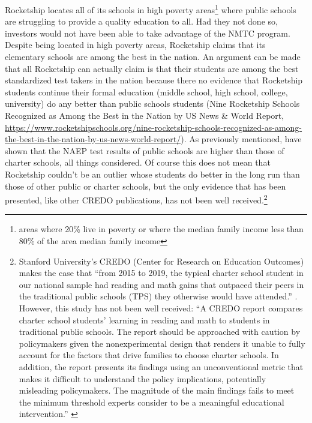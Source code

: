 Rocketship locates all of its schools in high poverty areas\footnote{areas where 20\% live in poverty or where the median family income less than 80\% of the area median family income\parencite[13-14]{CDFI2020}} where public schools are struggling to provide a quality education to all. Had they not done so, investors would not have been able to take advantage of the NMTC program. Despite being located in high poverty areas, Rocketship claims that its elementary schools are among the best in the nation. An argument can be made that all Rocketship can actually claim is that their students are among the best standardized test takers in the nation because there no evidence that Rocketship students continue their formal education (middle school, high school, college, university) do any better than public schools students (Nine Rocketship Schools Recognized as Among the Best in the Nation by US News \& World Report, \url{https://www.rocketshipschools.org/nine-rocketship-schools-recognized-as-among-the-best-in-the-nation-by-us-news-world-report/}). As previously mentioned, \textcite{Lubienski.Lubienski2014} have shown that the NAEP test results of public schools are higher than those of charter schools, all things considered. Of course this does not mean that Rocketship couldn't be an outlier whose students do better in the long run than those of other public or charter schools, but the only evidence that has been presented, like other CREDO publications, has not been well received.\footnote{Stanford University's CREDO (Center for Research on Education Outcomes) makes the case that ``from 2015 to 2019, the typical charter school student in our national sample had reading and math gains that outpaced their peers in the traditional public schools (TPS) they otherwise would have attended.'' \parencite{Raymond.etal2023}. However, this study has not been well received: ``A CREDO report compares charter school students’ learning in reading and math to students in traditional public schools. The report should be approached with caution by policymakers given the nonexperimental design that renders it unable to fully account for the factors that drive families to choose charter schools. In addition, the report presents its findings using an unconventional metric that makes it difficult to understand the policy implications, potentially misleading policymakers. The magnitude of the main findings fails to meet the minimum threshold experts consider to be a meaningful educational intervention.'' \parencite{Ferrare2023}}

